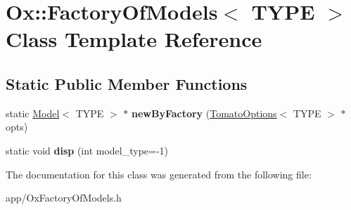 \hypertarget{class_ox_1_1_factory_of_models}{\section{Ox\-:\-:Factory\-Of\-Models$<$ T\-Y\-P\-E $>$ Class Template Reference}
\label{class_ox_1_1_factory_of_models}
}
\subsection*{Static Public Member Functions}
\begin{DoxyCompactItemize}
\item 
\hypertarget{class_ox_1_1_factory_of_models_a8aa8c31ff21f77ba4134098f68525c95}{static \hyperlink{class_ox_1_1_model}{Model}$<$ T\-Y\-P\-E $>$ $\ast$ {\bfseries new\-By\-Factory} (\hyperlink{struct_ox_1_1_tomato_options}{Tomato\-Options}$<$ T\-Y\-P\-E $>$ $\ast$opts)}\label{class_ox_1_1_factory_of_models_a8aa8c31ff21f77ba4134098f68525c95}

\item 
\hypertarget{class_ox_1_1_factory_of_models_a7f854079e81a2ef5e4e880b4a7ffb81e}{static void {\bfseries disp} (int model\-\_\-type=-\/1)}\label{class_ox_1_1_factory_of_models_a7f854079e81a2ef5e4e880b4a7ffb81e}

\end{DoxyCompactItemize}


The documentation for this class was generated from the following file\-:\begin{DoxyCompactItemize}
\item 
app/Ox\-Factory\-Of\-Models.\-h\end{DoxyCompactItemize}
